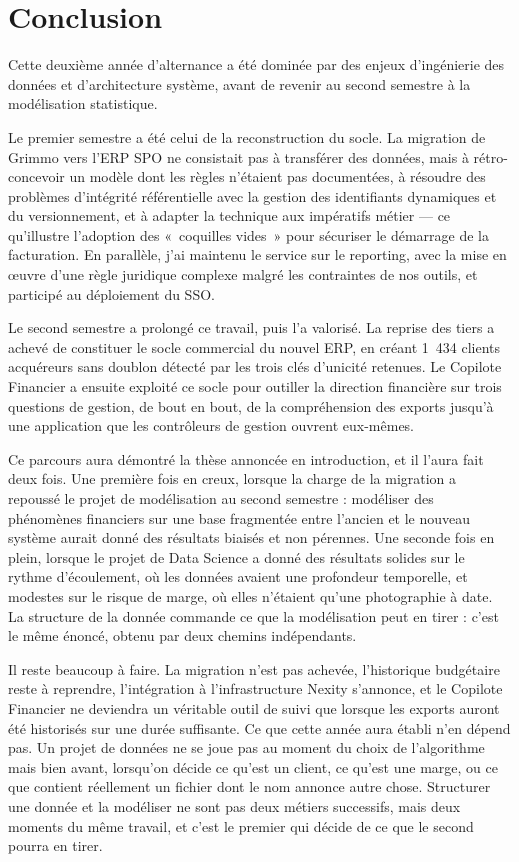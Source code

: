 
\chapter*{Conclusion}

Cette deuxième année d'alternance a été dominée par des enjeux d'ingénierie des données et
d'architecture système, avant de revenir au second semestre à la modélisation statistique.

Le premier semestre a été celui de la reconstruction du socle. La migration de Grimmo vers
l'ERP SPO ne consistait pas à transférer des données, mais à rétro-concevoir un modèle dont
les règles n'étaient pas documentées, à résoudre des problèmes d'intégrité référentielle avec
la gestion des identifiants dynamiques et du versionnement, et à adapter la technique aux
impératifs métier --- ce qu'illustre l'adoption des «~coquilles vides~» pour sécuriser le
démarrage de la facturation. En parallèle, j'ai maintenu le service sur le reporting, avec la
mise en œuvre d'une règle juridique complexe malgré les contraintes de nos outils, et
participé au déploiement du SSO.

Le second semestre a prolongé ce travail, puis l'a valorisé. La reprise des tiers a achevé de
constituer le socle commercial du nouvel ERP, en créant 1~434 clients acquéreurs sans doublon
détecté par les trois clés d'unicité retenues. Le Copilote Financier a ensuite exploité ce
socle pour outiller la direction financière sur trois questions de gestion, de bout en bout,
de la compréhension des exports jusqu'à une application que les contrôleurs de gestion ouvrent
eux-mêmes.

Ce parcours aura démontré la thèse annoncée en introduction, et il l'aura fait deux fois. Une
première fois en creux, lorsque la charge de la migration a repoussé le projet de modélisation
au second semestre : modéliser des phénomènes financiers sur une base fragmentée entre
l'ancien et le nouveau système aurait donné des résultats biaisés et non pérennes. Une seconde
fois en plein, lorsque le projet de Data Science a donné des résultats solides sur le rythme
d'écoulement, où les données avaient une profondeur temporelle, et modestes sur le risque de
marge, où elles n'étaient qu'une photographie à date. La structure de la donnée commande ce
que la modélisation peut en tirer : c'est le même énoncé, obtenu par deux chemins
indépendants.

Il reste beaucoup à faire. La migration n'est pas achevée, l'historique budgétaire reste à
reprendre, l'intégration à l'infrastructure Nexity s'annonce, et le Copilote Financier ne
deviendra un véritable outil de suivi que lorsque les exports auront été historisés sur une
durée suffisante. Ce que cette année aura établi n'en dépend pas. Un projet de données ne se
joue pas au moment du choix de l'algorithme mais bien avant, lorsqu'on décide ce qu'est un
client, ce qu'est une marge, ou ce que contient réellement un fichier dont le nom annonce
autre chose. Structurer une donnée et la modéliser ne sont pas deux métiers successifs, mais
deux moments du même travail, et c'est le premier qui décide de ce que le second pourra en
tirer.

